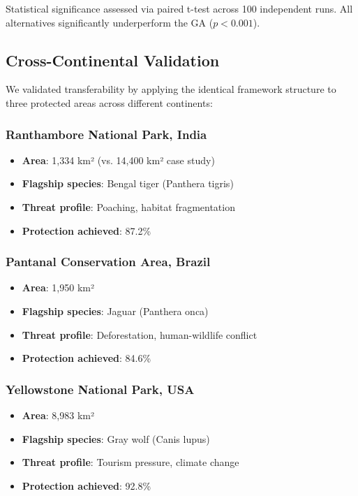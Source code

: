 Statistical significance assessed via paired t-test across 100 independent runs. All alternatives significantly underperform the GA ($p < 0.001$).

\subsection{Cross-Continental Validation}

We validated transferability by applying the identical framework structure to three protected areas across different continents:

\subsubsection{Ranthambore National Park, India}

\begin{itemize}
    \item \textbf{Area}: 1,334 km² (vs. 14,400 km² case study)
    \item \textbf{Flagship species}: Bengal tiger (Panthera tigris)
    \item \textbf{Threat profile}: Poaching, habitat fragmentation
    \item \textbf{Protection achieved}: 87.2\%
\end{itemize}

\subsubsection{Pantanal Conservation Area, Brazil}

\begin{itemize}
    \item \textbf{Area}: 1,950 km²
    \item \textbf{Flagship species}: Jaguar (Panthera onca)
    \item \textbf{Threat profile}: Deforestation, human-wildlife conflict
    \item \textbf{Protection achieved}: 84.6\%
\end{itemize}

\subsubsection{Yellowstone National Park, USA}

\begin{itemize}
    \item \textbf{Area}: 8,983 km²
    \item \textbf{Flagship species}: Gray wolf (Canis lupus)
    \item \textbf{Threat profile}: Tourism pressure, climate change
    \item \textbf{Protection achieved}: 92.8\%
\end{itemize}

